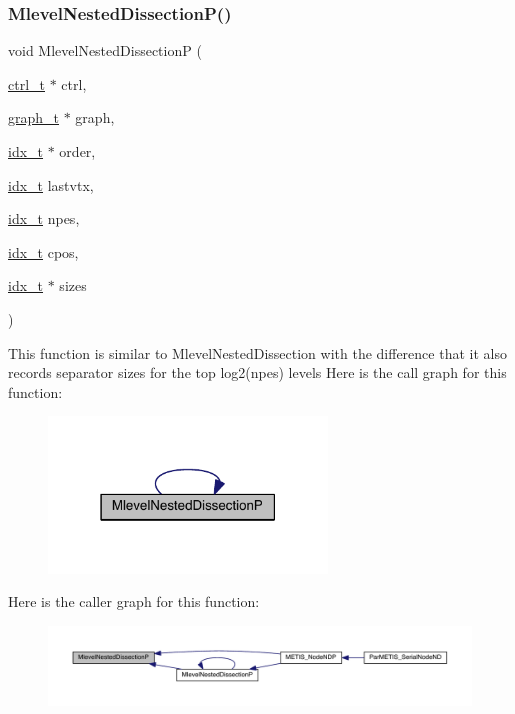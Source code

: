 \subsubsection{\texorpdfstring{Mlevel\+Nested\+Dissection\+P()}{MlevelNestedDissectionP()}}
{\footnotesize\ttfamily void Mlevel\+Nested\+DissectionP (\begin{DoxyParamCaption}\item[{\hyperlink{a00742}{ctrl\+\_\+t} $\ast$}]{ctrl,  }\item[{\hyperlink{a00734}{graph\+\_\+t} $\ast$}]{graph,  }\item[{\hyperlink{a00876_aaa5262be3e700770163401acb0150f52}{idx\+\_\+t} $\ast$}]{order,  }\item[{\hyperlink{a00876_aaa5262be3e700770163401acb0150f52}{idx\+\_\+t}}]{lastvtx,  }\item[{\hyperlink{a00876_aaa5262be3e700770163401acb0150f52}{idx\+\_\+t}}]{npes,  }\item[{\hyperlink{a00876_aaa5262be3e700770163401acb0150f52}{idx\+\_\+t}}]{cpos,  }\item[{\hyperlink{a00876_aaa5262be3e700770163401acb0150f52}{idx\+\_\+t} $\ast$}]{sizes }\end{DoxyParamCaption})}

This function is similar to Mlevel\+Nested\+Dissection with the difference that it also records separator sizes for the top log2(npes) levels Here is the call graph for this function\+:\nopagebreak
\begin{figure}[H]
\begin{center}
\leavevmode
\includegraphics[width=210pt]{a00939_a55cff7f4deda5d27c8736089a878964c_cgraph}
\end{center}
\end{figure}
Here is the caller graph for this function\+:\nopagebreak
\begin{figure}[H]
\begin{center}
\leavevmode
\includegraphics[width=350pt]{a00939_a55cff7f4deda5d27c8736089a878964c_icgraph}
\end{center}
\end{figure}
